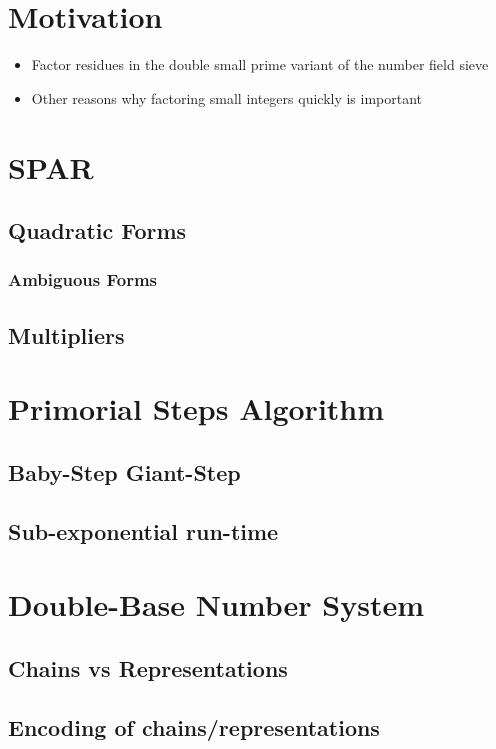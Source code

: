 \documentclass[11pt, letterpaper]{article}
\theoremstyle{definition}
\begin{document}
\section{Motivation}
\begin{itemize}
\item Factor residues in the double small prime variant of the number field sieve
\item Other reasons why factoring small integers quickly is important
\end{itemize}

\bigbreak
\section{SPAR}
\subsection{Quadratic Forms}
\subsubsection{Ambiguous Forms}
\subsection{Multipliers}


\bigbreak
\section{Primorial Steps Algorithm}
\subsection{Baby-Step Giant-Step}
\subsection{Sub-exponential run-time}


\bigbreak
\section{Double-Base Number System}
\subsection{Chains vs Representations}
\subsection{Encoding of chains/representations}
\end{document}

